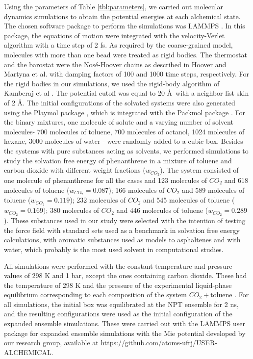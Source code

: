 \documentclass[final,12p,times,twocolumn]{elsarticle}
\begin{document}
	
	Using the parameters of Table \ref{tbl:parameters}, we carried out molecular dynamics simulations to obtain the potential energies at each alchemical state. The chosen software package to perform the simulations was LAMMPS  \cite{lammps}. In this package, the equations of motion were integrated with the velocity-Verlet algorithm \cite{verlet} with a time step of 2 fs. As required by the coarse-grained model,  molecules with more than one bead were treated as rigid bodies. The thermostat and the barostat were the Nos\'{e}-Hoover chains as described in Hoover \cite{PhysRevA.31.1695} and Martyna et al.  \cite{doi:10.1063/1.463940} with damping factors of 100 and 1000 time steps, respectively. For the rigid bodies in our simulations, we used the rigid-body algorithm of Kamberaj et al \cite{kamberaj}. The potential cutoff was equal to 20 \AA $\,$ \cite{muller2017} with a neighbor list skin of 2 \AA. The initial configurations of the solvated systems were also generated using the Playmol package \cite{playmol}, which is integrated with the Packmol package \cite{packmol}. For the binary mixtures, one molecule of solute and a varying number of solvent molecules- 700 molecules of toluene, 700 molecules of octanol, 1024 molecules of hexane, 3000 molecules of water - were randomly added to a cubic box. Besides the systems with pure substances acting as solvents, we performed simulations to study the solvation free energy of phenanthrene in a mixture of toluene and carbon dioxide with different weight fractions ($w_{CO_{2}}$). The  system consisted of one molecule of phenanthrene for all the cases and 123 molecules of $CO_{2}$ and 618 molecules of toluene ($w_{CO_{2}} = 0.087$); 166 molecules of $CO_{2}$ and 589 molecules of toluene ($w_{CO_{2}} = 0.119$); 232 molecules of $CO_{2}$ and 545 molecules of toluene ($w_{CO_{2}} = 0.169)$; 380 molecules of $CO_{2}$ and 446 molecules of toluene ($w_{CO_{2}} = 0.289$). These substances used in our study were selected with the intention of testing the force field with standard sets used as a benchmark in solvation free energy calculations, with aromatic substances used as models to asphaltenes and with water, which probably is the most used solvent in computational studies.
	
	All simulations were performed with the constant temperature and pressure values of 298 K and 1 bar, except the ones containing carbon dioxide. These had the temperature of 298 K and the pressure of the experimental liquid-phase equilibrium corresponding to each composition of the system $CO_{2}+$toluene \cite{co2toliq}. For all simulations, the initial box was equilibrated at the NPT ensemble for 2 ns, and the resulting configurations were used as the initial configuration of the expanded ensemble simulations. These were carried out with the LAMMPS user package for expanded ensemble simulations with the Mie potential developed by our research group, available at https://github.com/atoms-ufrj/USER-ALCHEMICAL.
	
\end{document}

